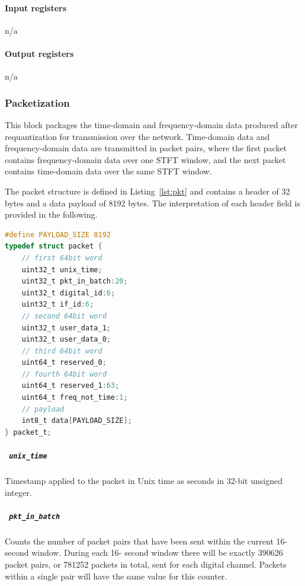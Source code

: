 \documentclass[a4paper,10pt]{article}
\newcommand{\lstref}[1]{Listing~\ref{#1}}
\newcommand{\ilcode}[1]{\begingroup
	\setlength{\fboxsep}{1pt}\colorbox{ilcodebg}{\small\tt%
		#1%
	}\endgroup}
\begin{document}
\paragraph{Input registers}
n/a

\paragraph{Output registers}
n/a

\subsubsection{Packetization}
\label{sec:gwdcppkt}
This block packages the time-domain and frequency-domain data produced 
after requantization for transmission over the network. Time-domain data 
and frequency-domain data are transmitted in packet pairs, where the 
first packet contains frequency-domain data over one STFT window, and 
the next packet contains time-domain data over the same STFT window.

The packet structure is defined in \lstref{lst:pkt} and contains a 
header of 32 bytes and a data payload of 8192 bytes. The interpretation 
of each header field is provided in the following.

\begin{minipage}{\linewidth}
\begin{lstlisting}[language=C,caption={Packet structure.},label={lst:pkt}]
#define PAYLOAD_SIZE 8192
typedef struct packet {
    // first 64bit word
    uint32_t unix_time;
    uint32_t pkt_in_batch:20;
    uint32_t digital_id:6;
    uint32_t if_id:6;
    // second 64bit word
    uint32_t user_data_1;
    uint32_t user_data_0;
    // third 64bit word
    uint64_t reserved_0;
    // fourth 64bit word
    uint64_t reserved_1:63;
    uint64_t freq_not_time:1;
    // payload
    int8_t data[PAYLOAD_SIZE];
} packet_t;
\end{lstlisting}
\end{minipage}

\subparagraph{\ilcode{unix\_time}} Timestamp applied to the packet in 
Unix time as seconds in 32-bit unsigned integer.

\subparagraph{\ilcode{pkt\_in\_batch}} Counts the number of packet pairs 
that have been sent within the current 16-second window. During each 16-
second window there will be exactly 390626 packet pairs, or 781252 
packets in total, sent for each digital channel. Packets within a single 
pair will have the same value for this counter.
\end{document}
